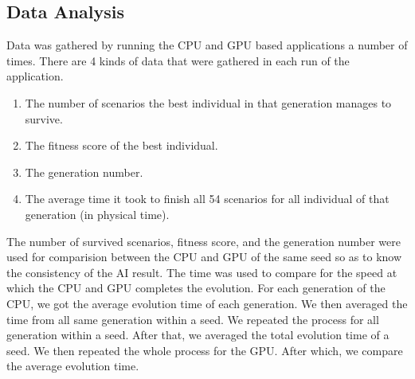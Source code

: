 \subsection{Data Analysis}
Data was gathered by running the CPU and GPU based applications a number of
times. There are 4 kinds of data that were gathered in each run of the application.

\begin{enumerate}
  \item The number of scenarios the best individual in that generation manages 
to survive.
  \item The fitness score of the best individual.
  \item The generation number.
  \item The average time it took to finish all 54 scenarios for all individual of 
that generation (in physical time).
\end{enumerate}

The number of survived scenarios, fitness score, and the generation number were used for 
comparision between the CPU and GPU of the same seed so as to know the consistency
of the AI result. The time was used to compare for the speed at which the CPU and GPU
completes the evolution. For each generation of the CPU, we got the average evolution
time of each generation. We then averaged the time from all same generation within a seed.
We repeated the process for all generation within a seed. After that, we averaged the 
total evolution time of a seed. We then repeated the whole process for the GPU. After
which, we compare the average evolution time.